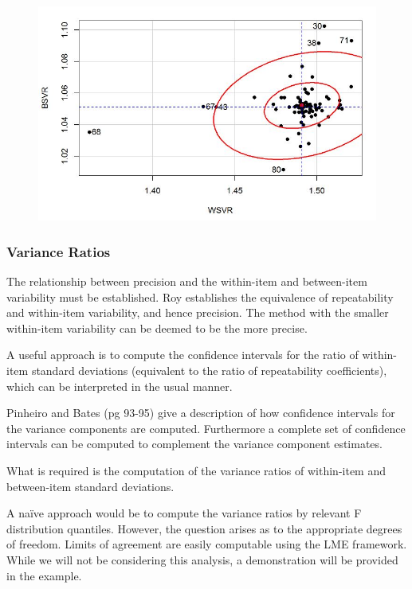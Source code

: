\documentclass[12pt, a4paper]{report}
\theoremstyle{plain}
\theoremstyle{definition}
\theoremstyle{remark}
\begin{document}
	\begin{figure}[h!]
		\centering
		\includegraphics[width=0.9\linewidth]{08-plot1}
		\caption{}
		\label{fig:08-plot1}
	\end{figure}
	
	
	
	
	\subsubsection{Variance Ratios}
	
	The relationship between precision and the within-item and between-item variability must be established. Roy establishes the equivalence of repeatability and within-item variability, and hence precision.  The method with the smaller within-item variability can be deemed to be the more precise.
	
	A useful approach is to compute the confidence intervals for the ratio of within-item standard deviations (equivalent to the ratio of repeatability coefficients), which can be interpreted in the usual manner.
	
	Pinheiro and Bates (pg 93-95) give a description of how confidence intervals for the variance components are computed. Furthermore a complete set of confidence intervals can be computed to complement the variance component estimates.
	
	What is required is the computation of the variance ratios of within-item and between-item standard deviations.
	
	A naïve approach would be to compute the variance ratios by relevant F distribution quantiles. However, the question arises as to the appropriate degrees of freedom.
	Limits of agreement are easily computable using the LME framework. While we will not be considering this analysis, a demonstration will be provided in the example.
	
\end{document}
